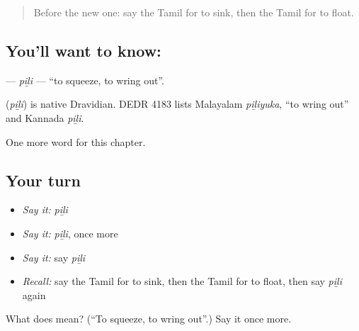\begin{quote}
Before the new one: say the Tamil for to sink, then the Tamil for to float.
\end{quote}

\subsection*{You'll want to know: }
\textbf{} — \emph{piḻi} — \textquotedblleft{}to squeeze, to wring out\textquotedblright{}.

\begin{cousinweb}
\textbf{} (\emph{piḻi}) is native Dravidian. DEDR 4183 lists Malayalam \emph{piḻiyuka}, \textquotedblleft{}to wring out\textquotedblright{} and Kannada \emph{piḻi}.
\end{cousinweb}

\begin{grammarlens}[title={What you've built}]
One more word for this chapter.
\end{grammarlens}

\subsection*{Your turn}
\begin{itemize}
\raggedright
  \item \emph{Say it:} \emph{piḻi}
  \item \emph{Say it:} \emph{piḻi}, once more
  \item \emph{Say it:} say \emph{piḻi}
  \item \emph{Recall:} say the Tamil for to sink, then the Tamil for to float, then say \emph{piḻi} again
\end{itemize}

\begin{tcolorbox}[breakable,colback=teal!4,colframe=teal!35!black,title={Before you move on}]
What does  mean? (\textquotedblleft{}To squeeze, to wring out\textquotedblright{}.) Say it once more.
\end{tcolorbox}
